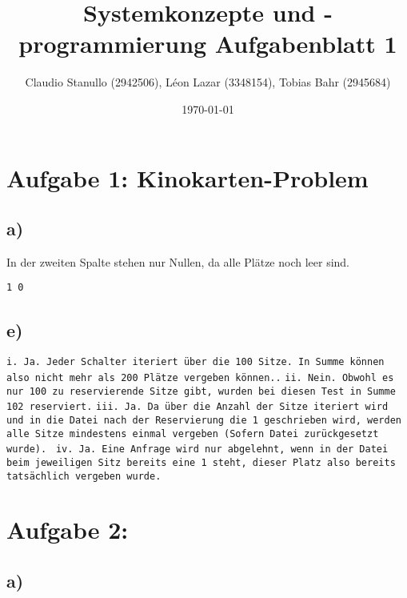\documentclass[12pt,pdftex,a4paper]{article}
\title{Systemkonzepte und -programmierung  Aufgabenblatt 1}
\author{Claudio Stanullo (2942506), Léon Lazar (3348154), Tobias Bahr (2945684)}
\date{\today}
\begin{document}
\maketitle
\section*{Aufgabe 1: Kinokarten-Problem}
\subsection*{a)}
In der zweiten Spalte stehen nur Nullen, da alle Plätze noch leer sind.

\texttt{1 0}

\subsection*{e)}


\texttt{i. Ja. Jeder Schalter iteriert über die 100 Sitze. In Summe können also nicht mehr als 200 Plätze vergeben können..}\newline\newline
\texttt{ii. Nein. Obwohl es nur 100 zu reservierende Sitze gibt, wurden bei diesen Test in Summe 102 reserviert.}\newline\newline
\texttt{iii. Ja. Da über die Anzahl der Sitze iteriert wird und in die Datei nach der Reservierung die 1 geschrieben wird, werden alle Sitze mindestens einmal vergeben (Sofern Datei zurückgesetzt wurde). }\newline\newline
\texttt{iv. Ja. Eine Anfrage wird nur abgelehnt, wenn in der Datei beim jeweiligen Sitz bereits eine 1 steht, dieser Platz also bereits tatsächlich vergeben wurde.}\newline\newline

\section*{Aufgabe 2: }

\subsection*{a)}
\end{document}
